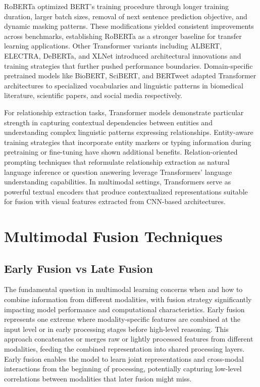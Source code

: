 \documentclass[12pt,a4paper]{report}
\begin{document}
RoBERTa optimized BERT's training procedure through longer training duration, larger batch sizes, removal of next sentence prediction objective, and dynamic masking patterns. These modifications yielded consistent improvements across benchmarks, establishing RoBERTa as a stronger baseline for transfer learning applications. Other Transformer variants including ALBERT, ELECTRA, DeBERTa, and XLNet introduced architectural innovations and training strategies that further pushed performance boundaries. Domain-specific pretrained models like BioBERT, SciBERT, and BERTweet adapted Transformer architectures to specialized vocabularies and linguistic patterns in biomedical literature, scientific papers, and social media respectively.

For relationship extraction tasks, Transformer models demonstrate particular strength in capturing contextual dependencies between entities and understanding complex linguistic patterns expressing relationships. Entity-aware training strategies that incorporate entity markers or typing information during pretraining or fine-tuning have shown additional benefits. Relation-oriented prompting techniques that reformulate relationship extraction as natural language inference or question answering leverage Transformers' language understanding capabilities. In multimodal settings, Transformers serve as powerful textual encoders that produce contextualized representations suitable for fusion with visual features extracted from CNN-based architectures.

\section{Multimodal Fusion Techniques}

\subsection{Early Fusion vs Late Fusion}

The fundamental question in multimodal learning concerns when and how to combine information from different modalities, with fusion strategy significantly impacting model performance and computational characteristics. Early fusion represents one extreme where modality-specific features are combined at the input level or in early processing stages before high-level reasoning. This approach concatenates or merges raw or lightly processed features from different modalities, feeding the combined representation into shared processing layers. Early fusion enables the model to learn joint representations and cross-modal interactions from the beginning of processing, potentially capturing low-level correlations between modalities that later fusion might miss.
\end{document}
